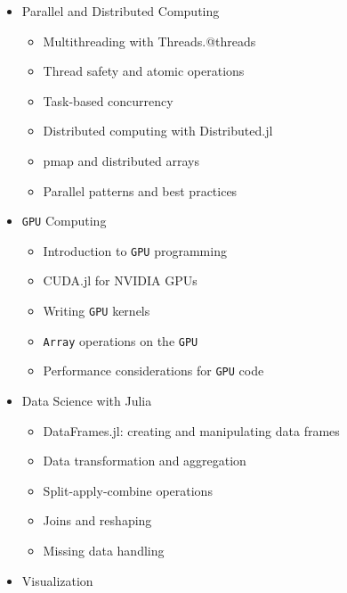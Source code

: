 \documentclass[
]{article}
\providecommand{\tightlist}{%
  \setlength{\itemsep}{0pt}\setlength{\parskip}{0pt}}
\begin{document}
\begin{itemize}
  \begin{itemize}
  \tightlist
  \item
    Type stability and its importance
  \item
    Benchmarking with BenchmarkTools.jl
  \item
    Profiling and identifying bottlenecks
  \item
    Memory allocation and avoiding allocations
  \item
    Performance annotations (@inbounds, @simd, @fastmath)
  \item
    Writing C-speed Julia code
  \end{itemize}
\item
  Parallel and Distributed Computing

  \begin{itemize}
  \tightlist
  \item
    Multithreading with Threads.@threads
  \item
    Thread safety and atomic operations
  \item
    Task-based concurrency
  \item
    Distributed computing with Distributed.jl
  \item
    pmap and distributed arrays
  \item
    Parallel patterns and best practices
  \end{itemize}
\item
  \texttt{GPU} Computing

  \begin{itemize}
  \tightlist
  \item
    Introduction to \texttt{GPU} programming
  \item
    CUDA.jl for NVIDIA GPUs
  \item
    Writing \texttt{GPU} kernels
  \item
    \texttt{Array} operations on the \texttt{GPU}
  \item
    Performance considerations for \texttt{GPU} code
  \end{itemize}
\item
  Data Science with Julia

  \begin{itemize}
  \tightlist
  \item
    DataFrames.jl: creating and manipulating data frames
  \item
    Data transformation and aggregation
  \item
    Split-apply-combine operations
  \item
    Joins and reshaping
  \item
    Missing data handling
  \end{itemize}
\item
  Visualization


\end{itemize}
\end{document}
